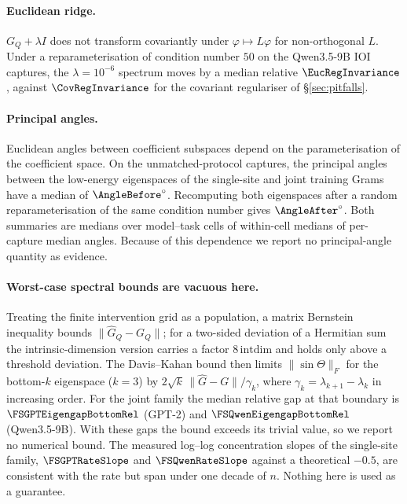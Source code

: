 \paragraph{Euclidean ridge.} $G_Q+\lambda I$ does not transform covariantly under $\varphi\mapsto L\varphi$ for
non-orthogonal $L$. Under a reparameterisation of condition number $50$ on the Qwen3.5-9B IOI captures, the
$\lambda=10^{-6}$ spectrum moves by a median relative $\EucRegInvariance$, against $\CovRegInvariance$ for the covariant
regulariser of \S\ref{sec:pitfalls}.

\paragraph{Principal angles.} Euclidean angles between coefficient subspaces depend on the parameterisation of the
coefficient space. On the unmatched-protocol captures, the principal angles between the low-energy eigenspaces of the single-site and
joint training Grams have a median of $\AngleBefore^\circ$. Recomputing both eigenspaces after a random
reparameterisation of the same condition number gives $\AngleAfter^\circ$. Both summaries are medians over model--task
cells of within-cell medians of per-capture median angles. Because of this dependence we report no principal-angle quantity as evidence.

\paragraph{Worst-case spectral bounds are vacuous here.} Treating the finite intervention grid as a population, a
matrix Bernstein inequality \citep{tropp2015introduction} bounds $\|\widehat G_Q-G_Q\|$; for a two-sided deviation of a
Hermitian sum the intrinsic-dimension version carries a factor $8\,\mathrm{intdim}$ and holds only above a threshold
deviation. The Davis--Kahan bound \citep{yu2015davis} then limits $\|\sin\Theta\|_F$ for the bottom-$k$
eigenspace ($k=3$) by $2\sqrt k\,\|\widehat G-G\|/\gamma_k$, where $\gamma_k=\lambda_{k+1}-\lambda_k$ in increasing
order. For the joint family the median relative gap at that boundary is $\FSGPTEigengapBottomRel$ (GPT-2) and
$\FSQwenEigengapBottomRel$ (Qwen3.5-9B). With these gaps the bound exceeds its trivial value, so we report no numerical bound. The measured log--log concentration slopes of the single-site family, $\FSGPTRateSlope$ and
$\FSQwenRateSlope$ against a theoretical $-0.5$, are consistent with the rate but span under one decade of $n$.
Nothing here is used as a guarantee.

